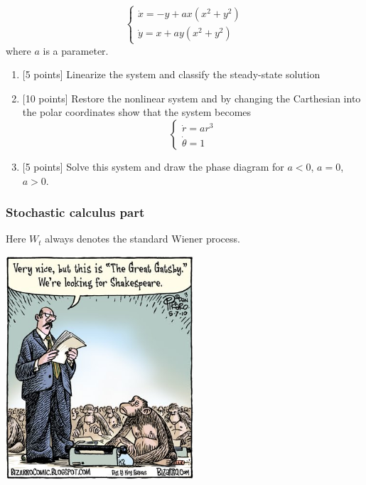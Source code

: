 \documentclass[12pt, a4paper]{article}
\begin{document}
\begin{enumerate}
\[
\begin{cases}
\dot{x}=-y+ax(x^2+y^2) \\
\dot{y}=x+ay(x^2+y^2)
\end{cases}
\]
where $a$ is a parameter.

\begin{enumerate}
\item $[$5 points] Linearize the system and classify the steady-state solution
\item $[$10 points] Restore the nonlinear system and by changing the Carthesian  into the polar coordinates show that the system becomes
\[
\begin{cases}
\dot{r}=ar^3 \\
\dot{\theta}=1
\end{cases}
\]

\item $[$5 points] Solve this system and draw the phase diagram for $a<0$, $a=0$, $a>0$.
\end{enumerate}


\end{enumerate}

\subsubsection*{Stochastic calculus part}

Here $W_t$ always denotes the standard Wiener process.

\vspace{10pt}

\begin{center}
\includegraphics[width=7cm]{figures/gatsby.jpg}
\end{center}

\vspace{10pt}
\end{document}
